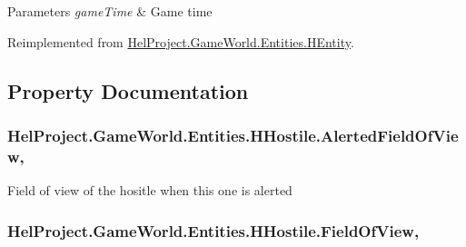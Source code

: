 \begin{DoxyParams}{Parameters}
{\em game\+Time} & Game time\\
\hline
\end{DoxyParams}


Reimplemented from \hyperlink{class_hel_project_1_1_game_world_1_1_entities_1_1_h_entity_a3feda059e3ebd1a20579260a6dc60291}{Hel\+Project.\+Game\+World.\+Entities.\+H\+Entity}.



\subsection{Property Documentation}
\hypertarget{class_hel_project_1_1_game_world_1_1_entities_1_1_h_hostile_afbd9573b6ebd47b3accade7d26f99675}{}
\subsubsection[{Alerted\+Field\+Of\+View}]{ Hel\+Project.\+Game\+World.\+Entities.\+H\+Hostile.\+Alerted\+Field\+Of\+View\hspace{0.3cm}{\ttfamily [get]}, {\ttfamily [set]}}\label{class_hel_project_1_1_game_world_1_1_entities_1_1_h_hostile_afbd9573b6ebd47b3accade7d26f99675}


Field of view of the hositle when this one is alerted 

\hypertarget{class_hel_project_1_1_game_world_1_1_entities_1_1_h_hostile_ae9b043f35166b59e96a84778894b12db}{}
\subsubsection[{Field\+Of\+View}]{ Hel\+Project.\+Game\+World.\+Entities.\+H\+Hostile.\+Field\+Of\+View\hspace{0.3cm}{\ttfamily [get]}, {\ttfamily [set]}}\label{class_hel_project_1_1_game_world_1_1_entities_1_1_h_hostile_ae9b043f35166b59e96a84778894b12db}


